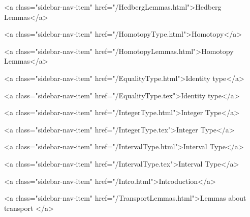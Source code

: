           <a class="sidebar-nav-item" href="/HedbergLemmas.html">Hedberg Lemmas</a>
        
      
    
      
        
          <a class="sidebar-nav-item" href="/HomotopyType.html">Homotopy</a>
        
      
    
      
        
          <a class="sidebar-nav-item" href="/HomotopyLemmas.html">Homotopy Lemmas</a>
        
      
    
      
        
          <a class="sidebar-nav-item" href="/EqualityType.html">Identity type</a>
        
      
    
      
        
          <a class="sidebar-nav-item" href="/EqualityType.tex">Identity type</a>
        
      
    
      
        
          <a class="sidebar-nav-item" href="/IntegerType.html">Integer Type</a>
        
      
    
      
        
          <a class="sidebar-nav-item" href="/IntegerType.tex">Integer Type</a>
        
      
    
      
        
          <a class="sidebar-nav-item" href="/IntervalType.html">Interval Type</a>
        
      
    
      
        
          <a class="sidebar-nav-item" href="/IntervalType.tex">Interval Type</a>
        
      
    
      
        
          <a class="sidebar-nav-item" href="/Intro.html">Introduction</a>
        
      
    
      
        
          <a class="sidebar-nav-item" href="/TransportLemmas.html">Lemmas about transport </a>
        
      
    
      
        
